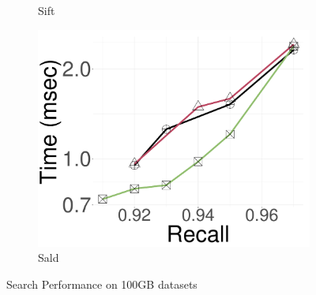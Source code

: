 \begin{figure}[!htb]
\begin{subfigure}{\soneM\textwidth}
			\caption{Sift}  
		\label{fig:elpis:query:performance:100GB:sift:10NN}
		\end{subfigure}
    \hspace{0.4cm}
  		\begin{subfigure}{\soneM\textwidth}
  \centering
			\includegraphics[width=\textwidth]{../img/Experiments/search/100/sald_10nn.pdf}
			\caption{Sald}  
		\label{fig:elpis:query:performance:100GB:sald:10NN}
		\end{subfigure}
		\caption{{Search Performance on 100GB datasets}}	
		\label{fig:elpis:query:performance:100GB}
	\end{figure}
 
